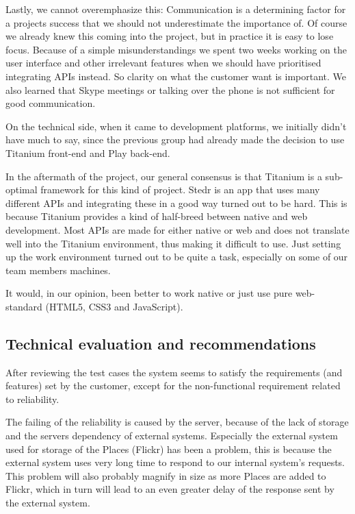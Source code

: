 Lastly, we cannot overemphasize this: Communication is a determining factor for a projects success that we should not underestimate the importance of. Of course we already knew this coming into the project, but in practice it is easy to lose focus. Because of a simple misunderstandings we spent two weeks working on the user interface and other irrelevant features when we should have prioritised integrating APIs instead. So clarity on what the customer want is important. We also learned that Skype meetings or talking over the phone is not sufficient for good communication.

On the technical side, when it came to development platforms, we initially didn't have much to say, since the previous group had already made the decision to use Titanium front-end and Play back-end.

In the aftermath of the project, our general consensus is that Titanium is a sub-optimal framework for this kind of project. Stedr is an app that uses many different APIs and integrating these in a good way turned out to be hard. This is because Titanium provides a kind of half-breed between native and web development. Most APIs are made for either native or web and does not translate well into the Titanium environment, thus making it difficult to use. Just setting up the work environment turned out to be quite a task, especially on some of our team members machines. 

It would, in our opinion, been better to work native or just use pure web-standard (HTML5, CSS3 and JavaScript).

	\subsection{Technical evaluation and recommendations}

After reviewing the test cases the system seems to satisfy the requirements (and features) set by the customer, except for the non-functional requirement related to reliability.

The failing of the reliability is caused by the server, because of the lack of storage and the servers dependency of external systems. Especially the external system used for storage of the Places (Flickr) has been a problem, this is because the external system uses very long time to respond to our internal system's requests. This problem will also probably magnify in size as more Places are added to Flickr, which in turn will lead to an even greater delay of the response sent by the external system.

